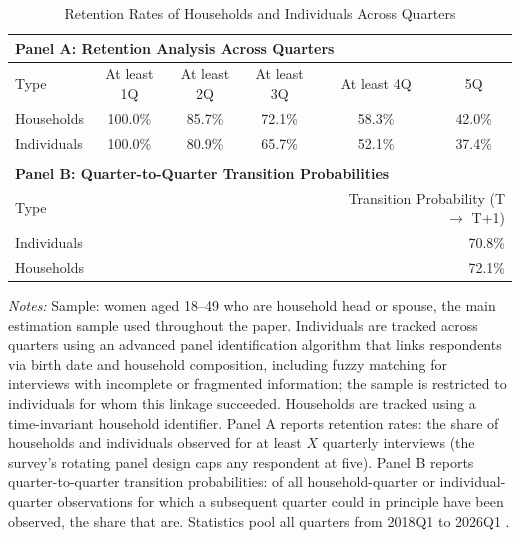 \begin{table}[H]
\centering
\caption{Retention Rates of Households and Individuals Across Quarters}
\label{tab:panel_retention}
\small
\begin{tabular}{lccccc}
\multicolumn{6}{l}{\textbf{Panel A: Retention Analysis Across Quarters}} \\
\toprule
Type & At least 1Q & At least 2Q & At least 3Q & At least 4Q & 5Q \\
\midrule
Households & 100.0\% & 85.7\% & 72.1\% & 58.3\% & 42.0\% \\
Individuals & 100.0\% & 80.9\% & 65.7\% & 52.1\% & 37.4\% \\
\bottomrule
\\
\multicolumn{6}{l}{\textbf{Panel B: Quarter-to-Quarter Transition Probabilities}} \\
\toprule
\multicolumn{4}{l}{Type} & \multicolumn{2}{r}{Transition Probability (T $\to$ T+1)} \\
\midrule
\multicolumn{4}{l}{Individuals} & \multicolumn{2}{r}{70.8\%} \\
\multicolumn{4}{l}{Households} & \multicolumn{2}{r}{72.1\%} \\
\bottomrule
\end{tabular}
\par\vspace{3pt}\footnotesize\raggedright \textit{Notes:} Sample: women aged 18--49 who are household head or spouse, the main estimation sample used throughout the paper. Individuals are tracked across quarters using an advanced panel identification algorithm that links respondents via birth date and household composition, including fuzzy matching for interviews with incomplete or fragmented information; the sample is restricted to individuals for whom this linkage succeeded. Households are tracked using a time-invariant household identifier. Panel A reports retention rates: the share of households and individuals observed for at least $X$ quarterly interviews (the survey's rotating panel design caps any respondent at five). Panel B reports quarter-to-quarter transition probabilities: of all household-quarter or individual-quarter observations for which a subsequent quarter could in principle have been observed, the share that are. Statistics pool all quarters from 
2018Q1 to 2026Q1
.
\end{table}
